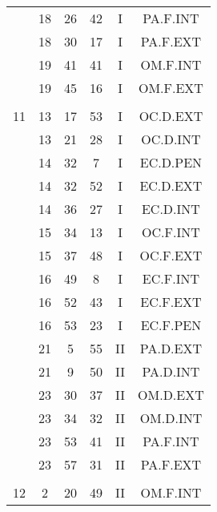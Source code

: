 \documentclass[12pt, a4paper]{article}
\begin{document}
\begin{multicols}{3}
{\begin{tabular}{c c c c c c}
	 	 	 	 & 18 & 26 & 42 & I & PA.F.INT\\%
	 	 	 	 & 18 & 30 & 17 & I & PA.F.EXT\\%
	 	 	 	 & 19 & 41 & 41 & I & OM.F.INT\\%
	 	 	 	 & 19 & 45 & 16 & I & OM.F.EXT\\%
	 	 	 	 & & & & & \\%
	 	 	 	11 & 13 & 17 & 53 & I & OC.D.EXT\\%
	 	 	 	 & 13 & 21 & 28 & I & OC.D.INT\\%
	 	 	 	 & 14 & 32 & 7 & I & EC.D.PEN\\%
	 	 	 	 & 14 & 32 & 52 & I & EC.D.EXT\\%
	 	 	 	 & 14 & 36 & 27 & I & EC.D.INT\\%
	 	 	 	 & 15 & 34 & 13 & I & OC.F.INT\\%
	 	 	 	 & 15 & 37 & 48 & I & OC.F.EXT\\%
	 	 	 	 & 16 & 49 & 8 & I & EC.F.INT\\%
	 	 	 	 & 16 & 52 & 43 & I & EC.F.EXT\\%
	 	 	 	 & 16 & 53 & 23 & I & EC.F.PEN\\%
	 	 	 	 & 21 & 5 & 55 & II & PA.D.EXT\\%
	 	 	 	 & 21 & 9 & 50 & II & PA.D.INT\\%
	 	 	 	 & 23 & 30 & 37 & II & OM.D.EXT\\%
	 	 	 	 & 23 & 34 & 32 & II & OM.D.INT\\%
	 	 	 	 & 23 & 53 & 41 & II & PA.F.INT\\%
	 	 	 	 & 23 & 57 & 31 & II & PA.F.EXT\\%
	 	 	 	 & & & & & \\%
	 	 	 	12 & 2 & 20 & 49 & II & OM.F.INT\\%
	 	 \end{tabular}
 	}
\end{multicols}
\end{document}
